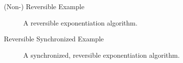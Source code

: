 \begin{frame}{(Non-) Reversible Example}
    \begin{figure}[htp]
        \centering     
        \begin{minipage}{.40\textwidth}
            
            \caption{A non-reversible exponentiation algorithm.}
            \label{fig:qcm_not_reverse}
        \end{minipage}
        \hfill
        \begin{minipage}{.50\textwidth}
            
            \caption{A reversible exponentiation algorithm.}    
            \label{fig:qcm_reverse}
        \end{minipage}
    \end{figure}
\end{frame}

\begin{frame}{Reversible Synchronized Example}
    \begin{figure}[htp]
        \centering     
        
        \caption{A synchronized, reversible exponentiation algorithm.}
        \label{fig:qcm_sync}
    \end{figure}
\end{frame}